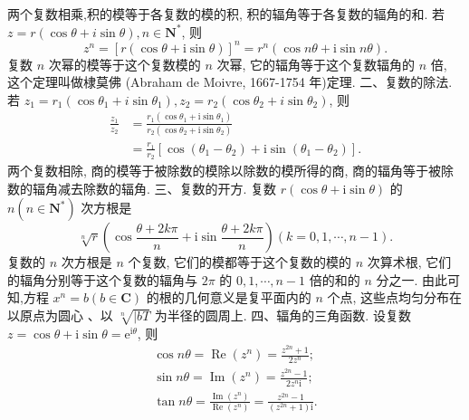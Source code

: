 两个复数相乘,积的模等于各复数的模的积, 积的辐角等于各复数的辐角的和.
若 $z=r(\cos \theta+i \sin \theta), n \in \mathbf{N}^*$, 则
$$
z^n=[r(\cos \theta+\mathrm{i} \sin \theta)]^n=r^n(\cos n \theta+\mathrm{i} \sin n \theta) .
$$
复数 $n$ 次幂的模等于这个复数模的 $n$ 次幂, 它的辐角等于这个复数辐角的 $n$ 倍, 这个定理叫做棣莫佛 (Abraham de Moivre, 1667-1754 年)定理.
二、复数的除法.
若 $z_1=r_1\left(\cos \theta_1+i \sin \theta_1\right), z_2=r_2\left(\cos \theta_2+i \sin \theta_2\right)$, 则
$$
\begin{aligned}
\frac{z_1}{z_2} & =\frac{r_1\left(\cos \theta_1+\mathrm{i} \sin \theta_1\right)}{r_2\left(\cos \theta_2+\mathrm{i} \sin \theta_2\right)} \\
& =\frac{r_1}{r_2}\left[\cos \left(\theta_1-\theta_2\right)+\mathrm{i} \sin \left(\theta_1-\theta_2\right)\right] .
\end{aligned}
$$
两个复数相除, 商的模等于被除数的模除以除数的模所得的商, 商的辐角等于被除数的辐角减去除数的辐角.
三、复数的开方.
复数 $r(\cos \theta+\mathrm{i} \sin \theta)$ 的 $n\left(n \in \mathbf{N}^*\right)$ 次方根是
$$
\sqrt[n]{r}\left(\cos \frac{\theta+2 k \pi}{n}+\mathrm{i} \sin \frac{\theta+2 k \pi}{n}\right)(k=0,1, \cdots, n-1) .
$$
复数的 $n$ 次方根是 $n$ 个复数, 它们的模都等于这个复数的模的 $n$ 次算术根, 它们的辐角分别等于这个复数的辐角与 $2 \pi$ 的 $0,1, \cdots, n-1$ 倍的和的 $n$ 分之一.
由此可知,方程 $x^n=b(b \in \mathbf{C})$ 的根的几何意义是复平面内的 $n$ 个点, 这些点均匀分布在以原点为圆心 、以 $\sqrt[n]{\mid b T}$ 为半径的圆周上.
四、辐角的三角函数.
设复数 $z=\cos \theta+\mathrm{i} \sin \theta=\mathrm{e}^{\mathrm{i} \theta}$, 则
$$
\begin{gathered}
\cos n \theta=\operatorname{Re}\left(z^n\right)=\frac{z^{2 n}+1}{2 z^n} ; \\
\sin n \theta=\operatorname{Im}\left(z^n\right)=\frac{z^{2 n}-1}{2 z^n \mathrm{i}} ; \\
\tan n \theta=\frac{\operatorname{Im}\left(z^n\right)}{\operatorname{Re}\left(z^n\right)}=\frac{z^{2 n}-1}{\left(z^{2 n}+1\right) \mathrm{i}} .
\end{gathered}
$$



